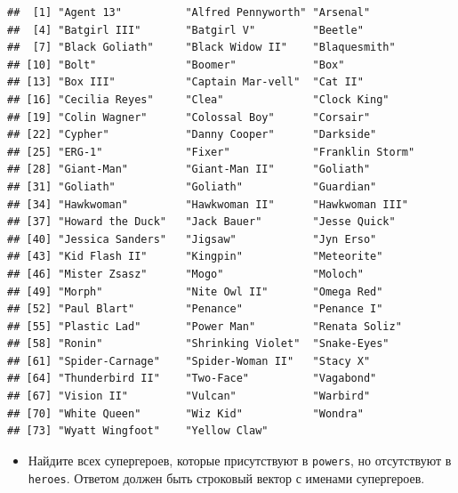 \documentclass[]{book}
\newenvironment{Shaded}{\begin{snugshade}}{\end{snugshade}}
\newcommand{\KeywordTok}[1]{\textcolor[rgb]{0.13,0.29,0.53}{\textbf{#1}}}
\newcommand{\DataTypeTok}[1]{\textcolor[rgb]{0.13,0.29,0.53}{#1}}
\newcommand{\StringTok}[1]{\textcolor[rgb]{0.31,0.60,0.02}{#1}}
\newcommand{\OperatorTok}[1]{\textcolor[rgb]{0.81,0.36,0.00}{\textbf{#1}}}
\newcommand{\NormalTok}[1]{#1}
\providecommand{\tightlist}{%
  \setlength{\itemsep}{0pt}\setlength{\parskip}{0pt}}
\begin{document}
\begin{verbatim}
##  [1] "Agent 13"          "Alfred Pennyworth" "Arsenal"          
##  [4] "Batgirl III"       "Batgirl V"         "Beetle"           
##  [7] "Black Goliath"     "Black Widow II"    "Blaquesmith"      
## [10] "Bolt"              "Boomer"            "Box"              
## [13] "Box III"           "Captain Mar-vell"  "Cat II"           
## [16] "Cecilia Reyes"     "Clea"              "Clock King"       
## [19] "Colin Wagner"      "Colossal Boy"      "Corsair"          
## [22] "Cypher"            "Danny Cooper"      "Darkside"         
## [25] "ERG-1"             "Fixer"             "Franklin Storm"   
## [28] "Giant-Man"         "Giant-Man II"      "Goliath"          
## [31] "Goliath"           "Goliath"           "Guardian"         
## [34] "Hawkwoman"         "Hawkwoman II"      "Hawkwoman III"    
## [37] "Howard the Duck"   "Jack Bauer"        "Jesse Quick"      
## [40] "Jessica Sanders"   "Jigsaw"            "Jyn Erso"         
## [43] "Kid Flash II"      "Kingpin"           "Meteorite"        
## [46] "Mister Zsasz"      "Mogo"              "Moloch"           
## [49] "Morph"             "Nite Owl II"       "Omega Red"        
## [52] "Paul Blart"        "Penance"           "Penance I"        
## [55] "Plastic Lad"       "Power Man"         "Renata Soliz"     
## [58] "Ronin"             "Shrinking Violet"  "Snake-Eyes"       
## [61] "Spider-Carnage"    "Spider-Woman II"   "Stacy X"          
## [64] "Thunderbird II"    "Two-Face"          "Vagabond"         
## [67] "Vision II"         "Vulcan"            "Warbird"          
## [70] "White Queen"       "Wiz Kid"           "Wondra"           
## [73] "Wyatt Wingfoot"    "Yellow Claw"
\end{verbatim}

\begin{itemize}
\tightlist
\item
  Найдите всех супергероев, которые присутствуют в \texttt{powers}, но
  отсутствуют в \texttt{heroes}. Ответом должен быть строковый вектор с
  именами супергероев.
\end{itemize}

\begin{Shaded}
\end{Shaded}
\end{document}
